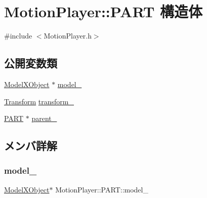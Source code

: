 \hypertarget{struct_motion_player_1_1_p_a_r_t}{}\section{Motion\+Player\+:\+:P\+A\+RT 構造体}
\label{struct_motion_player_1_1_p_a_r_t}


{\ttfamily \#include $<$Motion\+Player.\+h$>$}

\subsection*{公開変数類}
\begin{DoxyCompactItemize}
\item 
\mbox{\hyperlink{class_model_x_object}{Model\+X\+Object}} $\ast$ \mbox{\hyperlink{struct_motion_player_1_1_p_a_r_t_a40614e5a0d888a0642302254e924b551}{model\+\_\+}}
\item 
\mbox{\hyperlink{class_transform}{Transform}} \mbox{\hyperlink{struct_motion_player_1_1_p_a_r_t_a6f63db94daff421428a6ad093111162f}{transform\+\_\+}}
\item 
\mbox{\hyperlink{struct_motion_player_1_1_p_a_r_t}{P\+A\+RT}} $\ast$ \mbox{\hyperlink{struct_motion_player_1_1_p_a_r_t_a6c8afa1665a85864ab708451a2964a63}{parent\+\_\+}}
\end{DoxyCompactItemize}


\subsection{メンバ詳解}
\mbox{\label{struct_motion_player_1_1_p_a_r_t_a40614e5a0d888a0642302254e924b551}} 
\subsubsection{\texorpdfstring{model\+\_\+}{model\_}}
{\footnotesize\ttfamily \mbox{\hyperlink{class_model_x_object}{Model\+X\+Object}}$\ast$ Motion\+Player\+::\+P\+A\+R\+T\+::model\+\_\+}

\mbox{\label{struct_motion_player_1_1_p_a_r_t_a6c8afa1665a85864ab708451a2964a63}} 
